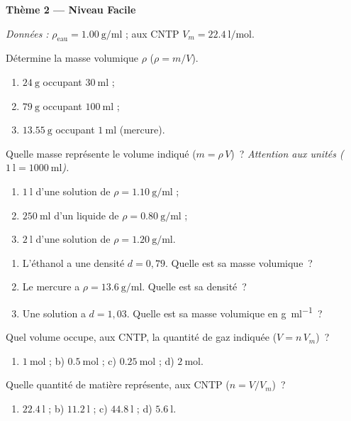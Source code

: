 \documentclass[11pt,a4paper]{article}
\begin{document}
\begin{center}{\large\bfseries\color{primarydark} Thème 2 — Niveau Facile}\end{center}
\emph{Données :} $\rho_{\text{eau}} = \SI{1.00}{\gram\per\milli\litre}$ ; aux CNTP
$V_m = \SI{22.4}{\litre\per\mole}$.

\begin{exo}
Détermine la masse volumique $\rho$ ($\rho = m/V$).
\begin{enumerate}[label=\alph*)]
  \item $\SI{24}{\gram}$ occupant $\SI{30}{\milli\litre}$ ;
  \item $\SI{79}{\gram}$ occupant $\SI{100}{\milli\litre}$ ;
  \item $\SI{13.55}{\gram}$ occupant $\SI{1}{\milli\litre}$ (mercure).
\end{enumerate}
\end{exo}

\begin{exo}
Quelle masse représente le volume indiqué ($m = \rho\,V$)~? \emph{Attention aux unités
($\SI{1}{\litre} = \SI{1000}{\milli\litre}$).}
\begin{enumerate}[label=\alph*)]
  \item $\SI{1}{\litre}$ d'une solution de $\rho = \SI{1.10}{\gram\per\milli\litre}$ ;
  \item $\SI{250}{\milli\litre}$ d'un liquide de $\rho = \SI{0.80}{\gram\per\milli\litre}$ ;
  \item $\SI{2}{\litre}$ d'une solution de $\rho = \SI{1.20}{\gram\per\milli\litre}$.
\end{enumerate}
\end{exo}

\begin{exo}
\begin{enumerate}[label=\alph*)]
  \item L'éthanol a une densité $d = 0{,}79$. Quelle est sa masse volumique~?
  \item Le mercure a $\rho = \SI{13.6}{\gram\per\milli\litre}$. Quelle est sa densité~?
  \item Une solution a $d = 1{,}03$. Quelle est sa masse volumique en \si{\gram\per\milli\litre}~?
\end{enumerate}
\end{exo}

\begin{exo}
Quel volume occupe, aux CNTP, la quantité de gaz indiquée ($V = n\,V_m$)~?
\begin{enumerate}[label=\alph*)]
  \item $\SI{1}{\mole}$ ; \quad b) $\SI{0.5}{\mole}$ ; \quad c) $\SI{0.25}{\mole}$ ; \quad d) $\SI{2}{\mole}$.
\end{enumerate}
\end{exo}

\begin{exo}
Quelle quantité de matière représente, aux CNTP ($n = V/V_m$)~?
\begin{enumerate}[label=\alph*)]
  \item $\SI{22.4}{\litre}$ ; \quad b) $\SI{11.2}{\litre}$ ; \quad c) $\SI{44.8}{\litre}$ ; \quad d) $\SI{5.6}{\litre}$.
\end{enumerate}
\end{exo}
\end{document}
